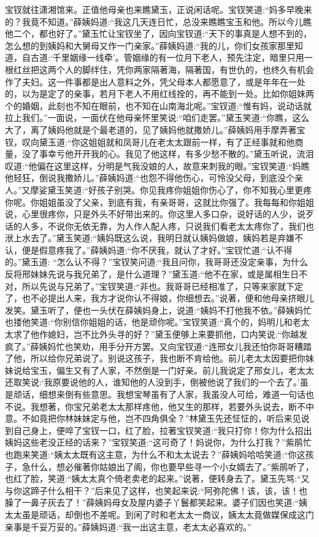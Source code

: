 \begin{parag}
    宝钗就往潇湘馆来。正值他母亲也来瞧黛玉，正说闲话呢。宝钗笑道:“妈多早晚来的？我竟不知道。”薛姨妈道:“我这几天连日忙，总没来瞧瞧宝玉和他。所以今儿瞧他二个，都也好了。”黛玉忙让宝钗坐了，因向宝钗道:“天下的事真是人想不到的，怎么想的到姨妈和大舅母又作一门亲家。”薛姨妈道:“我的儿，你们女孩家那里知道，自古道:‘千里姻缘一线牵’。管姻缘的有一位月下老人，预先注定，暗里只用一根红丝把这两个人的脚绊住，凭你两家隔著海，隔著国，有世仇的，也终久有机会作了夫妇。这一件事都是出人意料之外，凭父母本人都愿意了，或是年年在一处的，以为是定了的亲事，若月下老人不用红线拴的，再不能到一处。比如你姐妹两个的婚姻，此刻也不知在眼前，也不知在山南海北呢。”宝钗道:“惟有妈，说动话就拉上我们。”一面说，一面伏在他母亲怀里笑说:“咱们走罢。”黛玉笑道:“你瞧，这么大了，离了姨妈他就是个最老道的，见了姨妈他就撒娇儿。”薛姨妈用手摩弄著宝钗，叹向黛玉道:“你这姐姐就和凤哥儿在老太太跟前一样，有了正经事就和他商量，没了事幸亏他开开我的心。我见了他这样，有多少愁不散的。”黛玉听说，流泪叹道:“他偏在这里这样，分明是气我没娘的人，故意来刺我的眼。”宝钗笑道:“妈瞧他轻狂，倒说我撒娇儿。”薛姨妈道:“也怨不得他伤心，可怜没父母，到底没个亲人。”又摩娑黛玉笑道:“好孩子别哭。你见我疼你姐姐你伤心了，你不知我心里更疼你呢。你姐姐虽没了父亲，到底有我，有亲哥哥，这就比你强了。我每每和你姐姐说，心里很疼你，只是外头不好带出来的。你这里人多口杂，说好话的人少，说歹话的人多，不说你无依无靠，为人作人配人疼，只说我们看老太太疼你了，我们也洑上水去了。”黛玉笑道:“姨妈既这么说，我明日就认姨妈做娘，姨妈若是弃嫌不认，便是假意疼我了。”薛姨妈道:“你不厌我，就认了才好。”宝钗忙道:“认不得的。”黛玉道: “怎么认不得？”宝钗笑问道:“我且问你，我哥哥还没定亲事，为什么反将邢妹妹先说与我兄弟了，是什么道理？”黛玉道:“他不在家，或是属相生日不对，所以先说与兄弟了。”宝钗笑道:“非也。我哥哥已经相准了，只等来家就下定了，也不必提出人来，我方才说你认不得娘，你细想去。”说著，便和他母亲挤眼儿发笑。黛玉听了，便也一头伏在薛姨妈身上，说道:“姨妈不打他我不依。”薛姨妈忙也搂他笑道:“你别信你姐姐的话，他是顽你呢。”宝钗笑道:“真个的，妈明儿和老太太求了他作媳妇，岂不比外头寻的好？”黛玉便够上来要抓他，口内笑说:“你越发疯了。”薛姨妈忙也笑劝，用手分开方罢。又向宝钗道:“连邢女儿我还怕你哥哥糟踏了他，所以给你兄弟说了。别说这孩子，我也断不肯给他。前儿老太太因要把你妹妹说给宝玉，偏生又有了人家，不然倒是一门好亲。前儿我说定了邢女儿，老太太还取笑说:‘我原要说他的人，谁知他的人没到手，倒被他说了我们的一个去了。’虽是顽话，细想来倒有些意思。我想宝琴虽有了人家，我虽没人可给，难道一句话也不说。我想著，你宝兄弟老太太那样疼他，他又生的那样，若要外头说去，断不中意。不如竟把你林妹妹定与他，岂不四角俱全？”林黛玉先还怔怔的，听后来见说到自己身上，便啐了宝钗一口，红了脸，拉著宝钗笑道:“我只打你！你为什么招出姨妈这些老没正经的话来？”宝钗笑道:“这可奇了！妈说你，为什么打我？”紫鹃忙也跑来笑道:“姨太太既有这主意，为什么不和太太说去？”薛姨妈哈哈笑道:“你这孩子，急什么，想必催著你姑娘出了阁，你也要早些寻一个小女婿去了。”紫鹃听了，也红了脸，笑道:“姨太太真个倚老卖老的起来。”说著，便转身去了。黛玉先骂:“又与你这蹄子什么相干？”后来见了这样，也笑起来说:“阿弥陀佛！该，该，该！也臊了一鼻子灰去了！”薛姨妈母女及屋内婆子丫鬟都笑起来。婆子们因也笑道:“姨太太虽是顽话，却倒也不差呢。到闲了时和老太太一商议，姨太太竟做媒保成这门亲事是千妥万妥的。”薛姨妈道:“我一出这主意，老太太必喜欢的。”
\end{parag}


